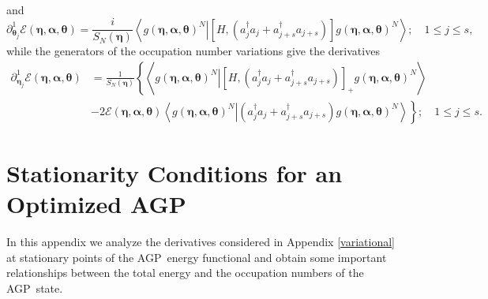 \documentclass[aps,preprint]{revtex4}%
\begin{document}
and
\begin{equation}
\partial_{\boldsymbol{\theta}_{j}}^{1}\mathcal{E}\left(  \boldsymbol{\eta
},\boldsymbol{\alpha},\boldsymbol{\theta}\right)  =\frac{i}{S_{N}\left(
\boldsymbol{\eta}\right)  }\left\langle \left.  g\left(  \boldsymbol{\eta
},\boldsymbol{\alpha},\boldsymbol{\theta}\right)  ^{N}\right\vert \left[
H,\left(  a_{j}^{\dagger}a_{j}+a_{j+s}^{\dagger}a_{j+s}\right)  \right]
g\left(  \boldsymbol{\eta},\boldsymbol{\alpha},\boldsymbol{\theta}\right)
^{N}\right\rangle ;\quad1\leq j\leq s, \label{Dtheta}%
\end{equation}
while the generators of the occupation number variations give the derivatives
\begin{align}
\partial_{\boldsymbol{\eta}_{j}}^{1}\mathcal{E}\left(  \boldsymbol{\eta
},\boldsymbol{\alpha},\boldsymbol{\theta}\right)   &  =\frac{1}{S_{N}\left(
\boldsymbol{\eta}\right)  }\left\{  \left\langle \left.  g\left(
\boldsymbol{\eta},\boldsymbol{\alpha},\boldsymbol{\theta}\right)
^{N}\right\vert \left[  H,\left(  a_{j}^{\dagger}a_{j}+a_{j+s}^{\dagger
}a_{j+s}\right)  \right]  _{+}g\left(  \boldsymbol{\eta},\boldsymbol{\alpha
},\boldsymbol{\theta}\right)  ^{N}\right\rangle \right. \nonumber\\
&  -\left.  2\mathcal{E}\left(  \boldsymbol{\eta},\boldsymbol{\alpha
},\boldsymbol{\theta}\right)  \left\langle \left.  g\left(  \boldsymbol{\eta
},\boldsymbol{\alpha},\boldsymbol{\theta}\right)  ^{N}\right\vert \left(
a_{j}^{\dagger}a_{j}+a_{j+s}^{\dagger}a_{j+s}\right)  g\left(
\boldsymbol{\eta},\boldsymbol{\alpha},\boldsymbol{\theta}\right)
^{N}\right\rangle \right\}  ;\quad1\leq j\leq s. \label{Deta}%
\end{align}


\section{Stationarity Conditions for an Optimized AGP\label{StatAGPCond}}

In this appendix we analyze the derivatives considered in Appendix
\ref{variational} at stationary points of the AGP\ energy functional and
obtain some important relationships between the total energy and the
occupation numbers of the AGP\ state.
\end{document}
